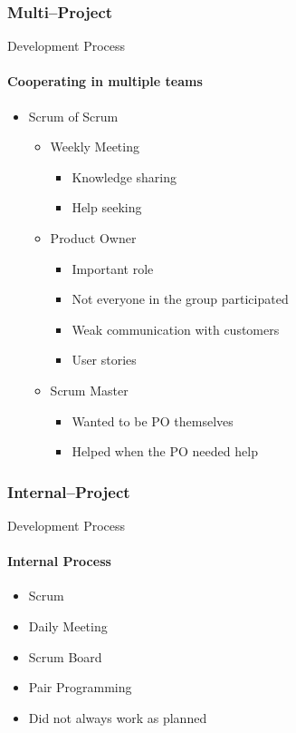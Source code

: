 	\subsubsection{Multi--Project}
    \begin{frame}[t]{Development Process}\framesubtitle{Cooperating in multiple teams}
    \begin{itemize}
        \item Scrum of Scrum
        	\begin{itemize}
        		\item Weekly Meeting
    			\begin{itemize}
        			\item Knowledge sharing 
        			\item Help seeking
        		\end{itemize}
        		\item Product Owner        			
    			\begin{itemize}
        			\item Important role
        			\item Not everyone in the group participated
        			\item Weak communication with customers
        			\item User stories
        		\end{itemize}
        		\item Scrum Master
        		\begin{itemize}
        			\item Wanted to be PO themselves
        			\item Helped when the PO needed help
        		\end{itemize}
    		\end{itemize}
    \end{itemize}
	\end{frame}
	 \subsubsection{Internal--Project}
	\begin{frame}[t]{Development Process}\framesubtitle{Internal Process}
    \begin{itemize}
        \item Scrum
        \item Daily Meeting
        \item Scrum Board
        \item Pair Programming
        \item Did not always work as planned
    \end{itemize}
	\end{frame}
